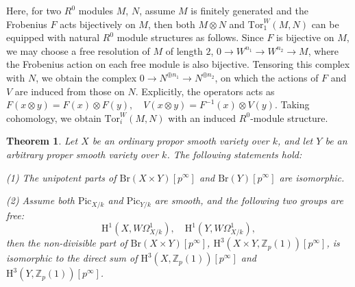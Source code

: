 \documentclass[a4paper,12pt,twoside]{report}
\newtheorem{theorem}{Theorem}[section]
\newcommand{\Z}{\mathbb{Z}}
\newcommand{\Pic}{\mathrm{Pic}}
\newcommand{\Br}{\mathrm{Br}}
\newcommand{\HH}{\mathrm{H}}
\newcommand{\Tor}{\mathrm{Tor}}
\begin{document}
Here, for two $R^0$ modules $M$, $N$, assume $M$ is finitely generated and the Frobenius $F$ acts bijectively on $M$, 
then both $M\otimes N$ and $\Tor_{1}^W(M,N)$ can be equipped with natural $R^0$ module structures as follows. 
Since $F$ is bijective on $M$, we may choose a free resolution of $M$ of length $2$, $0\rightarrow W^{n_1} \rightarrow W^{n_2} \rightarrow M$, 
where the Frobenius action on each free module is also bijective. 
Tensoring this complex with $N$, we obtain the complex $0\rightarrow N^{\oplus n_1}\rightarrow N^{\oplus n_2}$,
on which the actions of $F$ and $V$ are induced from those on $N$. 
Explicitly, the operators acts as $F(x\otimes y)=F(x)\otimes F(y),\quad V(x\otimes y)=F^{-1}(x)\otimes V(y).$
Taking cohomology, we obtain $\Tor^W_i(M,N)$ with an induced $R^0$-module structure. 

\begin{theorem}\label{prodord}
    Let $X$ be an ordinary propor smooth variety over $k$, 
    and let $Y$ be an arbitrary proper smooth variety over $k$. 
    The following statements hold: 
    
{\rm (1)} The unipotent parts of $\Br(X\times Y)[p^\infty]$ and $\Br(Y)[p^\infty]$ are isomorphic. 

{\rm (2)} Assume both $\Pic_{X/k}$ and $\Pic_{Y/k}$ are smooth, and the following two groups are free: 
\[ \HH^1(X,W\Omega^1_{X/k}),\quad \HH^1(Y,W\Omega^1_{X/k}),\]
then the non-divisible part of $\Br(X\times Y)[p^\infty]$, $\HH^3(X\times Y,\Z_p(1))[p^\infty]$, 
is isomorphic to the direct sum of $\HH^3(X,\Z_p(1))[p^\infty]$ and $\HH^3(Y,\Z_p(1))[p^\infty]$.  
\end{theorem}
\end{document}
